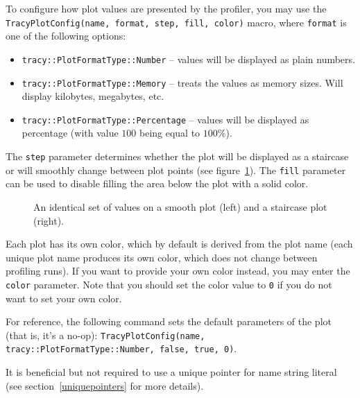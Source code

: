\documentclass[hidelinks,titlepage,a4paper]{article}
\begin{document}
To configure how plot values are presented by the profiler, you may use the \texttt{TracyPlotConfig(name, format, step, fill, color)} macro, where \texttt{format} is one of the following options:

\begin{itemize}
\item \texttt{tracy::PlotFormatType::Number} -- values will be displayed as plain numbers.
\item \texttt{tracy::PlotFormatType::Memory} -- treats the values as memory sizes. Will display kilobytes, megabytes, etc.
\item \texttt{tracy::PlotFormatType::Percentage} -- values will be displayed as percentage (with value $100$ being equal to $100\%$).
\end{itemize}

The \texttt{step} parameter determines whether the plot will be displayed as a staircase or will smoothly change between plot points (see figure~\ref{plotconfig}). The \texttt{fill} parameter can be used to disable filling the area below the plot with a solid color.

\begin{figure}[h]
\centering{}
\caption{An identical set of values on a smooth plot (left) and a staircase plot (right).}
\label{plotconfig}
\end{figure}

Each plot has its own color, which by default is derived from the plot name (each unique plot name produces its own color, which does not change between profiling runs). If you want to provide your own color instead, you may enter the \texttt{color} parameter. Note that you should set the color value to \texttt{0} if you do not want to set your own color.

For reference, the following command sets the default parameters of the plot (that is, it's a no-op): \texttt{TracyPlotConfig(name, tracy::PlotFormatType::Number, false, true, 0)}.

It is beneficial but not required to use a unique pointer for name string literal (see section~\ref{uniquepointers} for more details).
\end{document}
